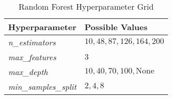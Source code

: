 \begin{table*}[h]
\centering
\caption{Random Forest Hyperparameter Grid}
\label{tab:table_rf}
\begingroup
\setlength{\tabcolsep}{10pt}
\renewcommand{\arraystretch}{2}%
\begin{tabular}{ll}
\hline
\textbf{Hyperparameter} 
& \textbf{Possible Values} \\ \hline
\textit{n\_estimators} 
& $10, 48, 87, 126, 164, 200$ \\
\textit{max\_features} 
& $3$ \\
\textit{max\_depth} 
& $10, 40, 70, 100, \text{None}$ \\
\textit{min\_samples\_split} 
& $2, 4, 8$ \\ \hline
\end{tabular}
\endgroup
\end{table*}